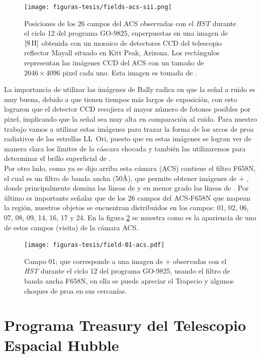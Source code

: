 \begin{figure}
  \centering
  \texttt{[image: figuras-tesis/fields-acs-sii.png]}
  \caption{Posiciones de los 26 campos del ACS observadas con el \textit{HST} durante el ciclo 12 del programa GO-9825, superpuestas en una imagen de \(\mathrm{[S\,II]}\) obtenida con un mosaico de detectores CCD del telescopio reflector Mayall situado en Kitt Peak, Arizona. Los rectángulos representan las imágenes CCD del ACS con un tamaño de \(2046 \times 4096\) pixel cada uno. Esta imagen es tomada de \citet{Bally:2006a}.}
  \label{fig:fields}
\end{figure}

La importancia de utilizar las imágenes de Bally radica en que la señal a ruido es muy buena, debido a que tienen tiempos más largos de exposición, con esto  lograron que el detector CCD recojiera el mayor número de fotones posibles por pixel, implicando que la señal sea muy alta en comparación al ruido. Para nuestro trabajo vamos a utilizar estas imágenes para trazar la forma de los arcos de proa radiativos de las estrellas LL~Ori, puesto que en estas imágenes se logran ver de manera clara los límites de la cáscara chocada y también las utilizaremos para determinar el brillo superficial de \ha{}.\\

Por otro lado, como ya se dijo arriba esta cámara (ACS) contiene el filtro F658N, el cual es un filtro de banda ancha (\(50 \text{Å}\)), que permite obtener imágenes de \ha{} + \nii{}, donde principalmente domina las líneas de \ha{} y en menor grado las líneas de \nii{}. Por último es importante señalar que de los 26 campos del ACS-F658N que mapean la región, nuestros objetos se encuentran distribuidos en los campos: 01, 02, 06, 07, 08, 09, 14, 16, 17 y 24. En la figura \ref{fig:field-01} se muestra como es la apariencia de uno de estos campos (visita) de la cámara ACS.\\

\begin{figure}
  \centering
  \texttt{[image: figuras-tesis/field-01-acs.pdf]}
  \caption{Campo 01; que corresponde a una imagen de \ha{}+\nii{} observadas con el \textit{HST} durante el ciclo 12 del programa GO-9825, usando el filtro de banda ancha F658N, en ella se puede apreciar el Trapecio y algunos choques de proa en sus cercanías.}
  \label{fig:field-01}
\end{figure}

\section{Programa Treasury del Telescopio Espacial Hubble}
\label{sec:wfpc2}


